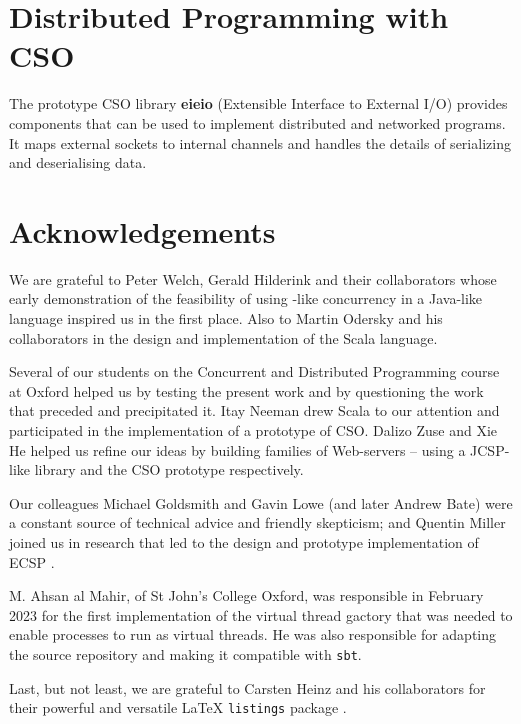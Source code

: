 \documentclass[12pt]{IOS-Book-Article-CPA-2017}
\begin{document}
\section{Distributed Programming with CSO}
The prototype  CSO library \textbf{eieio} (Extensible Interface to External I/O)
provides components that can be used to implement distributed and 
networked programs. It maps external sockets to internal channels and handles 
the details of serializing and deserialising data. 




\newpage
\section*{Acknowledgements}
We are grateful to Peter Welch, Gerald Hilderink and their
collaborators whose early demonstration of the feasibility of using
\occam-like concurrency in a Java-like language inspired us in the first place.
Also to Martin Odersky and his collaborators in the design and
implementation of the Scala language.

Several of our students on the Concurrent and Distributed Programming
course at Oxford helped us by testing the present work and by
questioning the work that preceded and precipitated it.  Itay Neeman
drew Scala to our attention and participated in the implementation
of a prototype of CSO. Dalizo Zuse and Xie He helped us refine our
ideas by building families of Web-servers -- using a JCSP-like
library and the CSO prototype respectively.

Our colleagues Michael Goldsmith and Gavin Lowe (and later
Andrew Bate) were a constant source of technical advice and
friendly skepticism; and Quentin Miller joined us in research that
led to the design and prototype implementation of ECSP \cite{ecsp,ecspman}.

M. Ahsan al Mahir, of St John's College Oxford, was responsible in
February 2023 for the first implementation of the virtual thread
gactory that was needed to enable processes to run as virtual
threads. He was also responsible for adapting the source repository
and making it compatible with \texttt{sbt}.

Last, but not least, we are grateful to Carsten Heinz and his
collaborators for their powerful and versatile LaTeX \texttt{listings} package
\cite{listings}.
\end{document}

